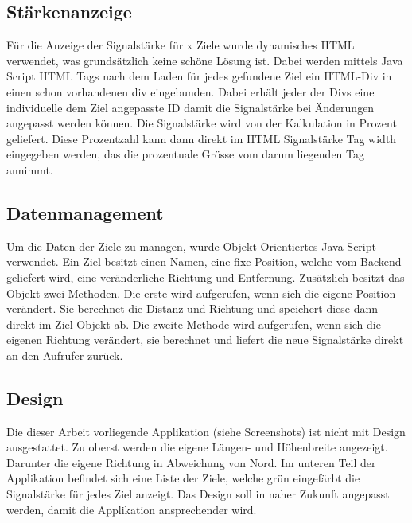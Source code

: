 \subsection{Stärkenanzeige} %
\label{sub:stärkenanzeige}
Für die Anzeige der Signalstärke für x Ziele wurde dynamisches HTML verwendet, was grundsätzlich keine schöne Lösung ist. Dabei werden mittels Java Script HTML Tags nach dem Laden für jedes gefundene Ziel ein HTML-Div in einen schon vorhandenen div eingebunden. Dabei erhält jeder der Divs eine individuelle dem Ziel angepasste ID damit die Signalstärke bei Änderungen angepasst werden können. Die Signalstärke wird von der Kalkulation in Prozent geliefert. Diese Prozentzahl kann dann direkt im HTML Signalstärke Tag width eingegeben werden, das die prozentuale Grösse vom darum liegenden Tag annimmt.

\subsection{Datenmanagement} %
\label{sub:datenmanagement}
Um die Daten der Ziele zu managen, wurde Objekt Orientiertes Java Script verwendet. Ein Ziel besitzt einen Namen, eine fixe Position, welche vom Backend geliefert wird, eine veränderliche Richtung und Entfernung. Zusätzlich besitzt das Objekt zwei Methoden. Die erste wird aufgerufen, wenn sich die eigene Position verändert. Sie berechnet die Distanz und Richtung und speichert diese dann direkt im Ziel-Objekt ab. Die zweite Methode wird aufgerufen, wenn sich die eigenen Richtung verändert, sie berechnet und liefert die neue Signalstärke direkt an den Aufrufer zurück. 

\subsection{Design} %
\label{sub:design}
Die dieser Arbeit vorliegende Applikation (siehe Screenshots) ist nicht mit Design ausgestattet. Zu oberst werden die eigene Längen- und Höhenbreite angezeigt. Darunter die eigene Richtung in Abweichung von Nord. 
Im unteren Teil der Applikation befindet sich eine Liste der Ziele, welche grün eingefärbt die Signalstärke für jedes Ziel anzeigt. Das Design soll in naher Zukunft angepasst werden, damit die Applikation ansprechender wird.

